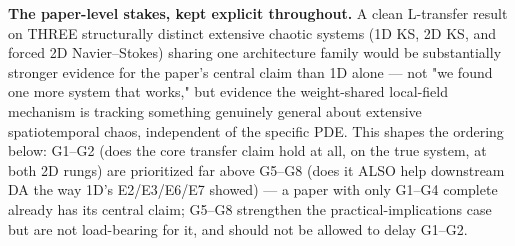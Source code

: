 \documentclass[11pt]{article}
\begin{document}
\textbf{The paper-level stakes, kept explicit throughout.} A clean
L-transfer result on THREE structurally distinct extensive chaotic
systems (1D KS, 2D KS, and forced 2D Navier--Stokes) sharing one
architecture family would be substantially stronger evidence for the
paper's central claim than 1D alone --- not "we found one more system
that works," but evidence the weight-shared local-field mechanism is
tracking something genuinely general about extensive spatiotemporal
chaos, independent of the specific PDE. This shapes the ordering below:
G1--G2 (does the core transfer claim hold at all, on the true system, at
both 2D rungs) are prioritized far above G5--G8 (does it ALSO help
downstream DA the way 1D's E2/E3/E6/E7 showed) --- a paper with only
G1--G4 complete already has its central claim; G5--G8 strengthen the
practical-implications case but are not load-bearing for it, and should
not be allowed to delay G1--G2.
\end{document}
